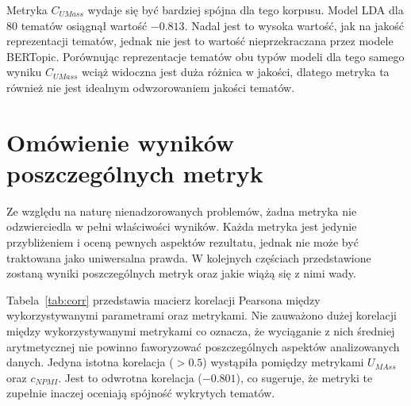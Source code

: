 	Metryka \(C_{UMass}\) wydaje się być bardziej spójna dla tego korpusu.
	Model LDA dla 80 tematów osiągnął wartość \(-0.813\).
	Nadal jest to wysoka wartość, jak na jakość reprezentacji tematów, jednak nie jest to wartość nieprzekraczana przez modele BERTopic.
	Porównując reprezentacje tematów obu typów modeli dla tego samego wyniku \(C_{UMass}\) wciąż widoczna jest duża różnica w jakości,
		dlatego metryka ta również nie jest idealnym odwzorowaniem jakości tematów.
	
\section{Omówienie wyników poszczególnych metryk}
	Ze względu na naturę nienadzorowanych problemów, żadna metryka nie odzwierciedla w pełni właściwości wyników.
	Każda metryka jest jedynie przybliżeniem i oceną pewnych aspektów rezultatu, jednak nie może być traktowana jako uniwersalna prawda.
	W kolejnych częściach przedstawione zostaną wyniki poszczególnych metryk oraz jakie wiążą się z nimi wady.

	Tabela~\ref{tab:corr} przedstawia macierz korelacji Pearsona między wykorzystywanymi parametrami oraz metrykami.
	Nie zauważono dużej korelacji między wykorzystywanymi metrykami co oznacza,
		że wyciąganie z nich średniej arytmetycznej nie powinno faworyzować poszczególnych aspektów analizowanych danych.
	Jedyna istotna korelacja (\(>0.5\)) wystąpiła pomiędzy metrykami \(U_{MAss}\) oraz \(c_{NPMI}\).
	Jest to odwrotna korelacja (\(-0.801\)), co sugeruje, że metryki te zupełnie inaczej oceniają spójność wykrytych tematów.

